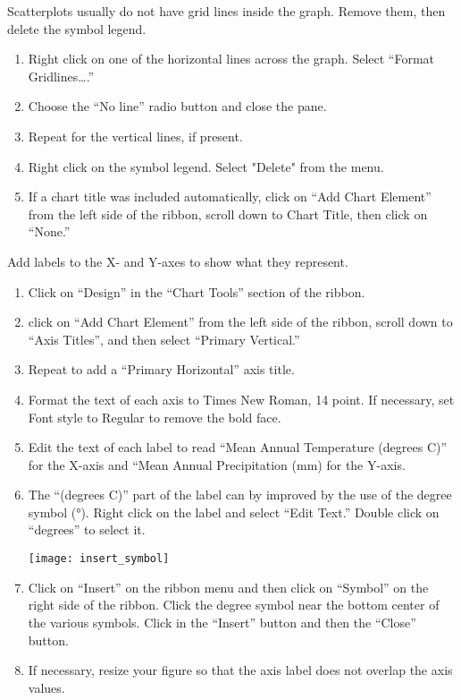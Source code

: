 \documentclass[12pt, hidelinks]{exam}
\begin{document}
Scatterplots usually do not have grid lines inside the graph. Remove them, then delete the symbol legend.

\begin{enumerate}[resume]
	\item Right click on one of the horizontal lines across the graph. Select “Format Gridlines….”

	\item Choose the “No line” radio button and close the pane. 

	\item Repeat for the vertical lines, if present.
	
	\item Right click on the symbol legend. Select "Delete" from the menu.
	
	\item If a chart title was included automatically, click on “Add Chart Element” from the left side of the ribbon, scroll down to Chart Title, then click on “None.” 
\end{enumerate}

Add labels to the X- and Y-axes to show what they represent.

\begin{enumerate}[resume]
	\item Click on “Design” in the “Chart Tools” section of the ribbon.

	\item click on “Add Chart Element” from the left side of the ribbon, scroll down to “Axis Titles”, and then select “Primary Vertical.”

	\item Repeat to add a “Primary Horizontal” axis title.

	\item Format the text of each axis to Times New Roman, 14 point. If necessary, set Font style to Regular to remove the bold face.

	\item Edit the text of each label to read “Mean Annual Temperature (degrees C)” for the X-axis and “Mean Annual Precipitation (mm) for the Y-axis.

	\item The “(degrees C)” part of the label can by improved by the use of the degree symbol (°). Right click on the label and select “Edit Text.” Double click on “degrees” to select it.

\begin{center}
	\texttt{[image: insert\_symbol]}
\end{center}

	\item Click on “Insert” on the ribbon menu and then click on “Symbol” on the right side of the ribbon. Click the degree symbol near the bottom center of the various symbols. Click in the “Insert” button and then the “Close” button. 
	
	\item If necessary, resize your figure so that the axis label does not overlap the axis values.
\end{enumerate}
 
\end{document}
